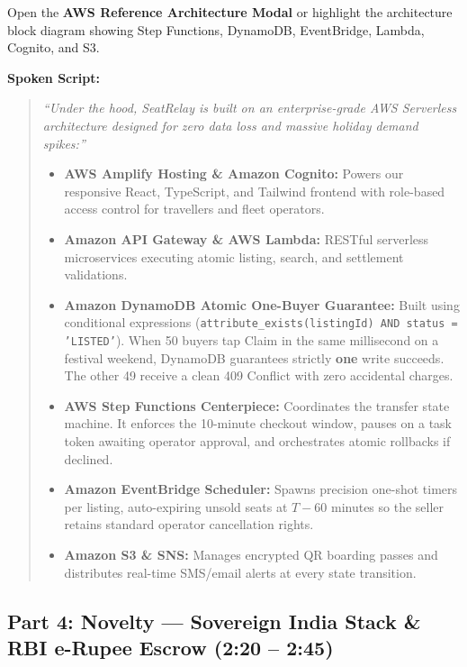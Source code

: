 \documentclass[11pt,a4paper]{article}
\begin{document}
\begin{visualcue}
Open the \textbf{AWS Reference Architecture Modal} or highlight the architecture block diagram showing Step Functions, DynamoDB, EventBridge, Lambda, Cognito, and S3.
\end{visualcue}

\noindent\textbf{Spoken Script:}
\begin{quote}
\textit{``Under the hood, SeatRelay is built on an enterprise-grade AWS Serverless architecture designed for zero data loss and massive holiday demand spikes:''}

\begin{itemize}[noitemsep,topsep=2pt]
    \item \textbf{AWS Amplify Hosting \& Amazon Cognito:} Powers our responsive React, TypeScript, and Tailwind frontend with role-based access control for travellers and fleet operators.
    \item \textbf{Amazon API Gateway \& AWS Lambda:} RESTful serverless microservices executing atomic listing, search, and settlement validations.
    \item \textbf{Amazon DynamoDB Atomic One-Buyer Guarantee:} Built using conditional expressions (\texttt{attribute\_exists(listingId) AND status = 'LISTED'}). When 50 buyers tap Claim in the same millisecond on a festival weekend, DynamoDB guarantees strictly \textbf{one} write succeeds. The other 49 receive a clean 409 Conflict with zero accidental charges.
    \item \textbf{AWS Step Functions Centerpiece:} Coordinates the transfer state machine. It enforces the 10-minute checkout window, pauses on a task token awaiting operator approval, and orchestrates atomic rollbacks if declined.
    \item \textbf{Amazon EventBridge Scheduler:} Spawns precision one-shot timers per listing, auto-expiring unsold seats at $T-60$ minutes so the seller retains standard operator cancellation rights.
    \item \textbf{Amazon S3 \& SNS:} Manages encrypted QR boarding passes and distributes real-time SMS/email alerts at every state transition.
\end{itemize}
\end{quote}

\vspace{0.4em}

\subsection*{Part 4: Novelty --- Sovereign India Stack \& RBI e-Rupee Escrow (2:20 -- 2:45)}
\end{document}
